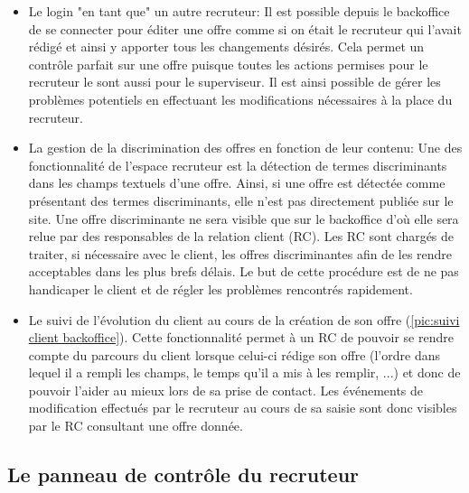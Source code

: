 \begin{itemize}
  \item Le login "en tant que" un autre recruteur:
  Il est possible depuis le backoffice de se connecter pour éditer une offre comme si on était le recruteur qui l'avait rédigé et ainsi y apporter tous les changements désirés.
  Cela permet un contrôle parfait sur une offre puisque toutes les actions permises pour le recruteur le sont aussi pour le superviseur.
  Il est ainsi possible de gérer les problèmes potentiels en effectuant les modifications nécessaires à la place du recruteur.
  \item La gestion de la discrimination des offres en fonction de leur contenu:
  Une des fonctionnalité de l'espace recruteur est la détection de termes discriminants dans les champs textuels d'une offre.
  Ainsi, si une offre est détectée comme présentant des termes discriminants, elle n'est pas directement publiée sur le site.
  Une offre discriminante ne sera visible que sur le backoffice d'où elle sera relue par des responsables de la relation client (RC).
  Les RC sont chargés de traiter, si nécessaire avec le client, les offres discriminantes afin de les rendre acceptables dans les plus brefs délais.
  Le but de cette procédure est de ne pas handicaper le client et de régler les problèmes rencontrés rapidement.
  \item Le suivi de l'évolution du client au cours de la création de son offre (\ref{pic:suivi client backoffice}).
  Cette fonctionnalité permet à un RC de pouvoir se rendre compte du parcours du client lorsque celui-ci rédige son offre (l'ordre dans lequel il a rempli les champs, le temps qu'il a mis à les remplir, ...) et donc de pouvoir l'aider au mieux lors de sa prise de contact.
  Les événements de modification effectués par le recruteur au cours de sa saisie sont donc visibles par le RC consultant une offre donnée.
\end{itemize}

\subsection{Le panneau de contrôle du recruteur}
